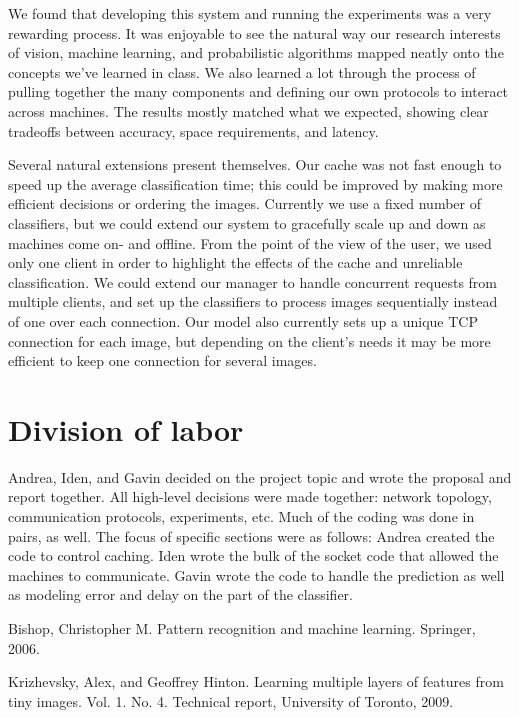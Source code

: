 \documentclass[11pt]{article}
\begin{document}
We found that developing this system and running the experiments was a very rewarding process.
It was enjoyable to see the natural way our research interests of vision, machine learning, and probabilistic algorithms mapped neatly onto the concepts we've learned in class.
We also learned a lot through the process of pulling together the many components and defining our own protocols to interact across machines.
The results mostly matched what we expected, showing clear tradeoffs between accuracy, space requirements, and latency.

Several natural extensions present themselves.
Our cache was not fast enough to speed up the average classification time; this could be improved by making more efficient decisions or ordering the images.
Currently we use a fixed number of classifiers, but we could extend our system to gracefully scale up and down as machines come on- and offline.
From the point of the view of the user, we used only one client in order to highlight the effects of the cache and unreliable classification.
We could extend our manager to handle concurrent requests from multiple clients, and set up the classifiers to process images sequentially instead of one over each connection.
Our model also currently sets up a unique TCP connection for each image, but depending on the client's needs it may be more efficient to keep one connection for several images.

\section{Division of labor}

Andrea, Iden, and Gavin decided on the project topic and wrote the proposal and report together.
All high-level decisions were made together: network topology, communication protocols, experiments, etc.
Much of the coding was done in pairs, as well.
The focus of specific sections were as follows: Andrea created the code to control caching.
Iden wrote the bulk of the socket code that allowed the machines to communicate.
Gavin wrote the code to handle the prediction as well as modeling error and delay on the part of the classifier.


\footnotesize\begin{thebibliography}{1}
    Bishop, Christopher M. Pattern recognition and machine learning. Springer, 2006.

    Krizhevsky, Alex, and Geoffrey Hinton. Learning multiple layers of features from tiny images. Vol. 1. No. 4. Technical report, University of Toronto, 2009.

\end{thebibliography}
\end{document}

